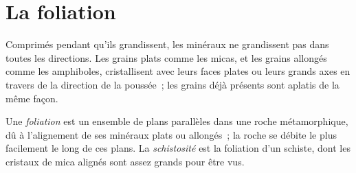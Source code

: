 \section{La foliation}\label{sec:g12:metamorphic-rocks:foliation}

Comprimés pendant qu'ils grandissent, les minéraux ne grandissent pas dans
toutes les directions. Les grains plats comme les micas, et les grains
allongés comme les amphiboles, cristallisent avec leurs faces plates ou
leurs grands axes en travers de la direction de la poussée~; les grains déjà
présents sont aplatis de la même façon.

\begin{definition}\label{def:g12:metamorphic-rocks:foliation}
Une \emph{foliation} est un ensemble de plans parallèles
dans une roche métamorphique, dû à l'alignement de ses minéraux plats ou
allongés~; la roche se débite le plus facilement le long de ces plans. La
\emph{schistosité} est la foliation d'un
schiste, dont les cristaux de mica alignés sont assez grands pour être vus.
\end{definition}

